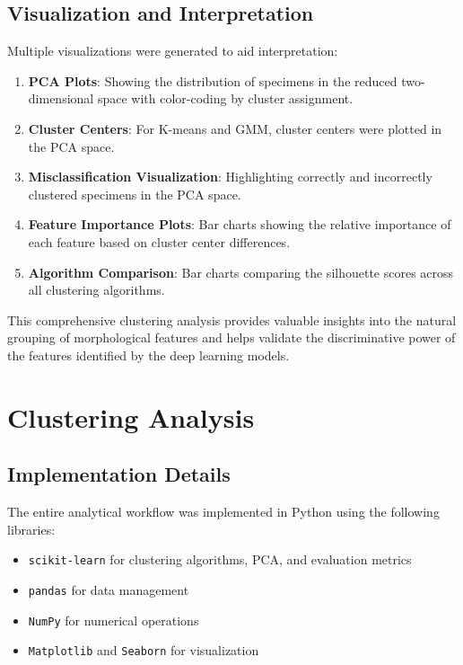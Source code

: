 \documentclass[a4paper,12pt]{report}
\begin{document}
\subsection{Visualization and Interpretation}

Multiple visualizations were generated to aid interpretation:
\begin{enumerate}
    \item \textbf{PCA Plots}: Showing the distribution of specimens in the reduced two-dimensional space with color-coding by cluster assignment.
    \item \textbf{Cluster Centers}: For K-means and GMM, cluster centers were plotted in the PCA space.
    \item \textbf{Misclassification Visualization}: Highlighting correctly and incorrectly clustered specimens in the PCA space.
    \item \textbf{Feature Importance Plots}: Bar charts showing the relative importance of each feature based on cluster center differences.
    \item \textbf{Algorithm Comparison}: Bar charts comparing the silhouette scores across all clustering algorithms.
\end{enumerate}

This comprehensive clustering analysis provides valuable insights into the natural grouping of morphological features and helps validate the discriminative power of the features identified by the deep learning models.

\section{Clustering Analysis}

\subsection{Implementation Details}

The entire analytical workflow was implemented in Python using the following libraries:
\begin{itemize}
    \item \texttt{scikit-learn} for clustering algorithms, PCA, and evaluation metrics
    \item \texttt{pandas} for data management
    \item \texttt{NumPy} for numerical operations
    \item \texttt{Matplotlib} and \texttt{Seaborn} for visualization
\end{itemize}
\end{document}

